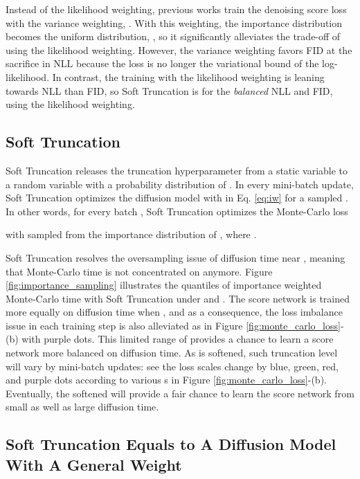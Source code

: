 \documentclass[nohyperref]{article}
\theoremstyle{plain}
\theoremstyle{definition}
\theoremstyle{remark}
\begin{document}
Instead of the likelihood weighting, previous works \cite{ho2020denoising, nichol2021improved, dhariwal2021diffusion} train the denoising score loss with the variance weighting, . With this weighting, the importance distribution becomes the uniform distribution, , so it significantly alleviates the trade-off of using the likelihood weighting. However, the variance weighting favors FID at the sacrifice in NLL because the loss is no longer the variational bound of the log-likelihood. In contrast, the training with the likelihood weighting is leaning towards NLL than FID, so Soft Truncation is for the \textit{balanced} NLL and FID, using the likelihood weighting.

\subsection{Soft Truncation}\label{sec:softrunc}

Soft Truncation releases the truncation hyperparameter from a static variable to a random variable with a probability distribution of . In every mini-batch update, Soft Truncation optimizes the diffusion model with  in Eq. \eqref{eq:iw} for a sampled . In other words, for every batch , Soft Truncation optimizes the Monte-Carlo loss

with  sampled from the importance distribution of , where . 

Soft Truncation resolves the oversampling issue of diffusion time near , meaning that Monte-Carlo time is not concentrated on  anymore. Figure \ref{fig:importance_sampling} illustrates the quantiles of importance weighted Monte-Carlo time with Soft Truncation under  and . The score network is trained more equally on diffusion time when , and as a consequence, the loss imbalance issue in each training step is also alleviated as in Figure \ref{fig:monte_carlo_loss}-(b) with purple dots. This limited range of  provides a chance to learn a score network more balanced on diffusion time. As  is softened, such truncation level will vary by mini-batch updates: see the loss scales change by blue, green, red, and purple dots according to various s in Figure \ref{fig:monte_carlo_loss}-(b). Eventually, the softened  will provide a fair chance to learn the score network from small as well as large diffusion time.

\subsection{Soft Truncation Equals to A Diffusion Model With A General Weight}\label{sec:soft_truncation_general_weight}
\end{document}
